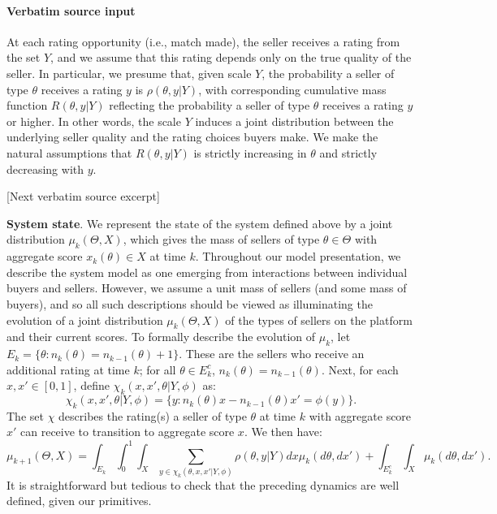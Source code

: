 \documentclass[10pt]{article}
\begin{document}
\paragraph{Verbatim source input}
\begin{ReviewVerbatim}
At each rating opportunity (i.e., match made), the seller receives a rating from the set $Y$, and we assume that this rating depends only on the true quality of the seller. In particular, we presume that, given scale $Y$, the probability a seller of type $\theta$ receives a rating $y$ is $\rho(\theta, y | Y)$, with corresponding cumulative mass function $R(\theta,y| Y)$ reflecting the probability a seller of type $\theta$ receives a rating $y$ or higher. In other words, the scale $Y$ induces a joint distribution between the underlying seller quality and the rating choices buyers make. We make the natural assumptions that $R(\theta,y| Y)$ is strictly increasing in $\theta$ and strictly decreasing with $y$.

[Next verbatim source excerpt]

{\bf System state}.  We represent the state of the system defined above by a joint distribution $\mu_k(\Theta, X)$, which gives the mass of sellers of type $\theta \in \Theta$ with aggregate score $x_k(\theta) \in X$ at time $k$. Throughout our model presentation, we describe the system model as one emerging from interactions between individual buyers and sellers. However, we assume a unit mass of sellers (and some mass of buyers), and so all such descriptions should be viewed as illuminating the evolution of a joint distribution $\mu_k (\Theta, X)$ of the types of sellers on the platform and their current scores. To formally describe the evolution of $\mu_k$, let $E_k = \{ \theta : n_k(\theta) = n_{k-1}(\theta) + 1 \}$.  These are the sellers who receive an additional rating at time $k$; for all $\theta \in E_k^c$, $n_k(\theta) = n_{k-1}(\theta)$.  Next, for each $x, x' \in [0,1]$, define $\chi_k(x, x',\theta | Y, {\phi})$ as:
\[
{\chi_k(x, x',\theta | Y, \phi) =} \{ y : n_k(\theta)x - n_{k-1}(\theta)x' = \phi(y) \}.
\]
The set $\chi$ describes the rating(s) a seller of type $\theta$ at time $k$ with aggregate score $x'$ can receive to transition to aggregate score $x$.  We then have:
\[ \mu_{k+1}(\Theta, X) = \int_{E_k} \int_0^1 \int_X \sum_{y \in \chi_k(\theta, x, x' | Y, \phi)} \rho(\theta, y | Y)  dx \mu_k(d\theta, dx') + \int_{E_k^c} \int_X \mu_k(d\theta, dx'). \]
It is straightforward but tedious to check that the preceding dynamics are well defined, given our primitives.
\end{ReviewVerbatim}
\end{document}

